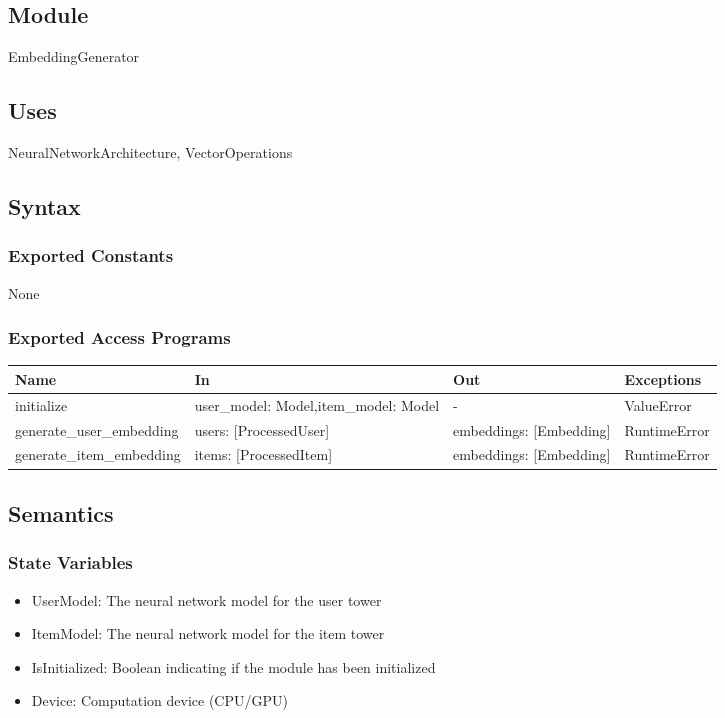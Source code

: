 \documentclass[12pt, titlepage]{article}
\begin{document}
\subsection{Module}

EmbeddingGenerator

\subsection{Uses}
NeuralNetworkArchitecture, VectorOperations

\subsection{Syntax}

\subsubsection{Exported Constants}
None
\subsubsection{Exported Access Programs}

\begin{center}
  \begin{tabular}{p{5cm} p{4cm} p{4cm} p{3cm}}
  \hline
  \textbf{Name} & \textbf{In} & \textbf{Out} & \textbf{Exceptions} \\
  \hline
  initialize & user\_model: Model,item\_model: Model & - & ValueError \\
  \hline
  generate\_user\_embedding & users: [ProcessedUser] & embeddings: [Embedding] & RuntimeError\\
  \hline
  generate\_item\_embedding & items: [ProcessedItem] & embeddings: [Embedding] & RuntimeError\\
  \hline
  \end{tabular}
\end{center}

\subsection{Semantics}

\subsubsection{State Variables}
\begin{itemize}
  \item UserModel: The neural network model for the user tower
  \item ItemModel: The neural network model for the item tower
  \item IsInitialized: Boolean indicating if the module has been initialized
  \item Device: Computation device (CPU/GPU)
\end{itemize}
\end{document}
